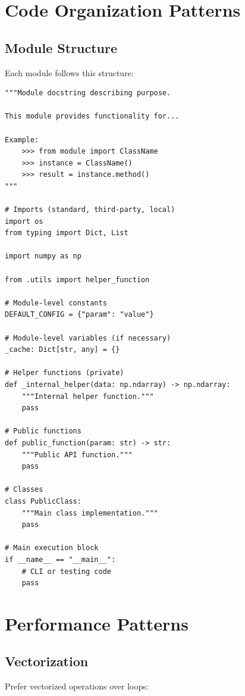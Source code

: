 \section{Code Organization Patterns}

\subsection{Module Structure}

Each module follows this structure:

\begin{lstlisting}[style=python, caption=Standard Module Structure]
"""Module docstring describing purpose.

This module provides functionality for...

Example:
    >>> from module import ClassName
    >>> instance = ClassName()
    >>> result = instance.method()
"""

# Imports (standard, third-party, local)
import os
from typing import Dict, List

import numpy as np

from .utils import helper_function

# Module-level constants
DEFAULT_CONFIG = {"param": "value"}

# Module-level variables (if necessary)
_cache: Dict[str, any] = {}

# Helper functions (private)
def _internal_helper(data: np.ndarray) -> np.ndarray:
    """Internal helper function."""
    pass

# Public functions
def public_function(param: str) -> str:
    """Public API function."""
    pass

# Classes
class PublicClass:
    """Main class implementation."""
    pass

# Main execution block
if __name__ == "__main__":
    # CLI or testing code
    pass
\end{lstlisting}

\section{Performance Patterns}

\subsection{Vectorization}

Prefer vectorized operations over loops:

